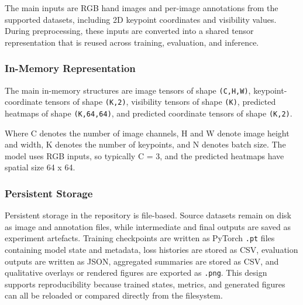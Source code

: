 ﻿\documentclass[11pt,a4paper]{article}
\begin{document}
The main inputs are RGB hand images and per-image
annotations from the supported datasets, including 2D keypoint coordinates and
visibility values. During preprocessing, these inputs are converted into a
shared tensor representation that is reused across training, evaluation, and
inference.

\subsubsection*{In-Memory Representation}

The main in-memory structures are image tensors of shape \texttt{(C,H,W)},
keypoint-coordinate tensors of shape \texttt{(K,2)}, visibility tensors of
shape \texttt{(K)}, predicted heatmaps of shape \texttt{(K,64,64)}, and
predicted coordinate tensors of shape \texttt{(K,2)}.

Where C denotes the number of image channels, H and W denote image height and
width, K denotes the number of keypoints, and N denotes batch size. The model
uses RGB inputs, so typically C = 3, and the predicted heatmaps have spatial
size 64 x 64.

\subsubsection*{Persistent Storage}

Persistent storage in the repository is file-based. Source datasets remain on
disk as image and annotation files, while intermediate and final outputs are
saved as experiment artefacts. Training checkpoints are written as PyTorch
\texttt{.pt} files containing model state and metadata, loss histories are
stored as CSV, evaluation outputs are written as JSON, aggregated summaries are
stored as CSV, and qualitative overlays or rendered figures are exported as
\texttt{.png}.
This design supports reproducibility because trained states, metrics, and
generated figures can all be reloaded or compared directly from the
filesystem.

\medskip
\end{document}
